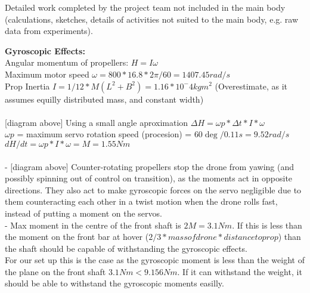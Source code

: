 \color{red}
Detailed work completed by the project team not included in the main body (calculations, sketches, details of activities not suited to the main body, e.g. raw data from experiments).
\color{black}

\textbf{Gyroscopic Effects:}\\

Angular momentum of propellers: $H = I\omega$\\
Maximum motor speed $\omega = 800*16.8*2\pi/60 = 1407.45rad/s$\\
Prop Inertia $I = 1/12*M(L^2+B^2) = 1.16*10^-4kgm^2$ (Overestimate, as it assumes equilly distributed mass, and constant width)\\\\

[diagram above] Using a small angle aproximation $\Delta H = \omega p*\Delta t*I*\omega$\\ 
$\omega p$ = maximum servo rotation speed (procesion) = $60\deg/0.11s = 9.52rad/s$\\
$dH/dt = \omega p*I*\omega = M = 1.55Nm$\\\\

- [diagram above] Counter-rotating propellers stop the drone from yawing (and possibly spinning out of control on transition), as the moments act in opposite directions. They also act to make gyroscopic forces on the servo negligible due to them counteracting each other in a twist motion when the drone rolls fast, instead of putting a moment on the servos.\\
- Max moment in the centre of the front shaft is $2M = 3.1Nm$. If this is less than the moment on the front bar at hover ($2/3*mass of drone * distance to prop$) than the shaft should be capable of withstanding the gyroscopic effects.\\
For our set up this is the case as the gyroscopic moment is less than the weight of the plane on the front shaft $3.1Nm < 9.156Nm$. If it can withstand the weight, it should be able to withstand the gyroscopic moments easilly.


